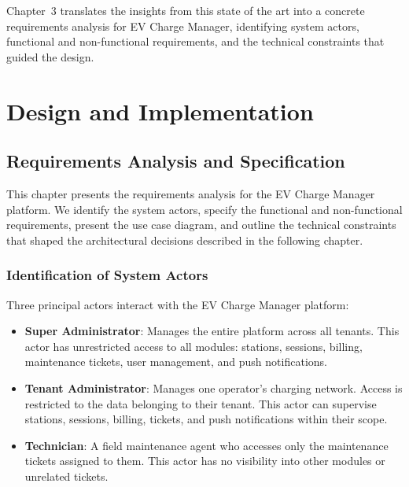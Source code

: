 \documentclass[12pt,a4paper]{report}
\begin{document}
Chapter~3 translates the insights from this state of the art into a concrete requirements
analysis for EV Charge Manager, identifying system actors, functional and non-functional
requirements, and the technical constraints that guided the design.

\clearpage


\part*{Design and Implementation}


\chapter{Requirements Analysis and Specification}

This chapter presents the requirements analysis for the EV Charge Manager platform. We identify
the system actors, specify the functional and non-functional requirements, present the use case
diagram, and outline the technical constraints that shaped the architectural decisions described
in the following chapter.

\section{Identification of System Actors}

Three principal actors interact with the EV Charge Manager platform:

\begin{itemize}
  \item \textbf{Super Administrator}: Manages the entire platform across all tenants. This actor
        has unrestricted access to all modules: stations, sessions, billing, maintenance tickets,
        user management, and push notifications.
  \item \textbf{Tenant Administrator}: Manages one operator's charging network. Access is
        restricted to the data belonging to their tenant. This actor can supervise stations,
        sessions, billing, tickets, and push notifications within their scope.
  \item \textbf{Technician}: A field maintenance agent who accesses only the maintenance tickets
        assigned to them. This actor has no visibility into other modules or unrelated tickets.
\end{itemize}
\end{document}
